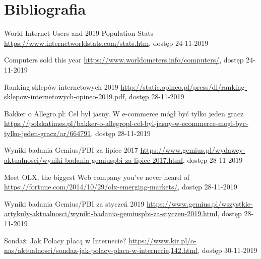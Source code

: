 \documentclass[12pt]{article}
\numberwithin{figure}{section}
\begin{document}
    \section{Bibliografia}
    \renewcommand{\section}[2]{}
    \begin{thebibliography}{99}
    
    World Internet Users and 2019 Population Stats
    \url{https://www.internetworldstats.com/stats.htm}, dostęp 24-11-2019

    Computers sold this year
    \url{https://www.worldometers.info/computers/}, dostęp 24-11-2019
     
    Ranking sklepów internetowych 2019
    \url{http://static.opineo.pl/press/dl/ranking-sklepow-internetowych-opineo-2019.pdf}, dostęp 28-11-2019
    
    Bakker o Allegro.pl: Cel był jasny. W e-commerce mógł być tylko jeden gracz
    \url{https://polskatimes.pl/bakker-o-allegropl-cel-byl-jasny-w-ecommerce-mogl-byc-tylko-jeden-gracz/ar/664791}, dostęp 28-11-2019
    
    Wyniki badania Gemius/PBI za lipiec 2017
    \url{https://www.gemius.pl/wydawcy-aktualnosci/wyniki-badania-gemiuspbi-za-lipiec-2017.html}, dostęp 28-11-2019
    
    Meet OLX, the biggest Web company you’ve never heard of
    \url{https://fortune.com/2014/10/29/olx-emerging-markets/}, dostęp 28-11-2019
    
    Wyniki badania Gemius/PBI za styczeń 2019
    \url{https://www.gemius.pl/wszystkie-artykuly-aktualnosci/wyniki-badania-gemiuspbi-za-styczen-2019.html}, dostęp 28-11-2019
    
    Sondaż: Jak Polacy płacą w Internecie?
    \url{https://www.kir.pl/o-nas/aktualnosci/sondaz-jak-polacy-placa-w-internecie,142.html}, dostęp 30-11-2019
    

\end{thebibliography}
\end{document}
